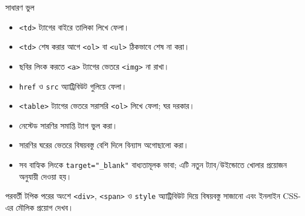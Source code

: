 \begin{mistakebox}{সাধারণ ভুল}
\par\noindent
\begin{minipage}[t]{.48\linewidth}\vspace{0pt}
\begin{itemize}
\item \texttt{<td>} ট্যাগের বাইরে তালিকা লিখে ফেলা।
\item \texttt{<td>} শেষ করার আগে \texttt{<ol>} বা \texttt{<ul>} ঠিকভাবে শেষ না করা।
\item ছবির লিংক করতে \texttt{<a>} ট্যাগের ভেতরে \texttt{<img>} না রাখা।
\item \texttt{href} ও \texttt{src} অ্যাট্রিবিউট গুলিয়ে ফেলা।
\end{itemize}
\end{minipage}\hfill
\begin{minipage}[t]{.48\linewidth}\vspace{0pt}
\begin{itemize}
\item \texttt{<table>} ট্যাগের ভেতরে সরাসরি \texttt{<ol>} লিখে ফেলা; ঘর দরকার।
\item নেস্টেড সারণির সমাপ্তি ট্যাগ ভুল করা।
\item সারণির ঘরের ভেতরে বিষয়বস্তু বেশি দিলে বিন্যাস অগোছালো করা।
\item সব বাহ্যিক লিংকে \texttt{target="\_blank"} বাধ্যতামূলক ভাবা; এটি নতুন ট্যাব/উইন্ডোতে খোলার প্রয়োজন অনুযায়ী দেওয়া হয়।
\end{itemize}
\end{minipage}\par

\end{mistakebox}

\begin{boardbox}{পরবর্তী টপিক}
পরের অংশে \texttt{<div>}, \texttt{<span>} ও \texttt{style} অ্যাট্রিবিউট দিয়ে বিষয়বস্তু সাজানো এবং ইনলাইন CSS-এর মৌলিক প্রয়োগ দেখব।
\end{boardbox}

\setcounter{collectmore}{-4}
